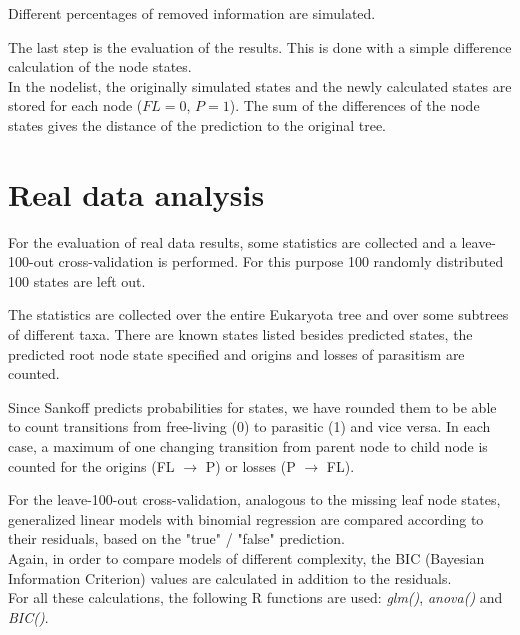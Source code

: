     Different percentages of removed information are simulated.
  
    The last step is the evaluation of the results. This is done with a simple difference calculation 
      of the node states. \\
    In the nodelist, the originally simulated states and the newly calculated states are stored for 
      each node ($FL = 0$, $P = 1$). The sum of the differences of the node states gives the distance 
      of the prediction to the original tree.

  \section{Real data analysis}
    For the evaluation of real data results, some statistics are collected and a leave-100-out 
      cross-validation is performed. For this purpose 100 randomly distributed 100 states are left out.

    The statistics are collected over the entire Eukaryota tree and over some subtrees of different 
      taxa. There are known states listed besides predicted states, the predicted root node state 
      specified and origins and losses of parasitism are counted.

    Since Sankoff predicts probabilities for states, we have rounded them to be able to count 
      transitions from free-living (0) to parasitic (1) and vice versa. In each case, a maximum of one 
      changing transition from parent node to child node is counted for the origins (FL $\rightarrow$ 
      P) or losses (P $\rightarrow$ FL).
    
    For the leave-100-out cross-validation, analogous to the missing leaf node states, generalized 
      linear models with binomial regression are compared according to their residuals, based on the 
      "true" / "false" prediction. \\
    Again, in order to compare models of different complexity, the BIC (Bayesian Information Criterion) 
      values are calculated in addition to the residuals. \\
    For all these calculations, the following R functions are used: \textit{glm()}, \textit{anova()} 
      and \textit{BIC()}. \\

